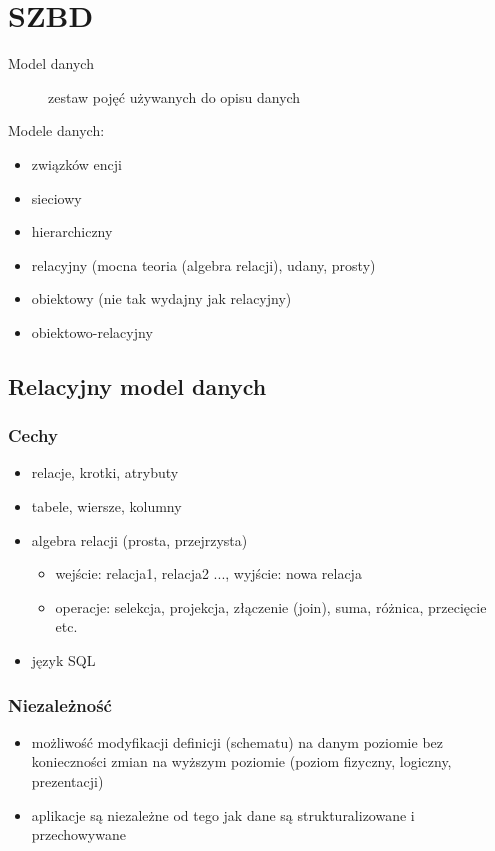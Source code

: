 \documentclass[12pt]{article}
\begin{document}
\section{\ac{SZBD}}

\begin{description}
\item[Model danych] zestaw pojęć używanych do opisu danych
\end{description}

Modele danych:
\begin{itemize}
\item związków encji
\item sieciowy
\item hierarchiczny
\item relacyjny (mocna teoria (algebra relacji), udany, prosty)
\item obiektowy (nie tak wydajny jak relacyjny)
\item obiektowo-relacyjny
\end{itemize}

\subsection{Relacyjny model danych}
\subsubsection{Cechy}

\begin{itemize}
\item relacje, krotki, atrybuty
\item tabele, wiersze, kolumny
\item algebra relacji (prosta, przejrzysta)
\begin{itemize}
\item wejście: relacja1, relacja2 ..., wyjście: nowa relacja
\item operacje: selekcja, projekcja, złączenie (join), suma, różnica, przecięcie etc.
\end{itemize}
\item język \acs{SQL}
\end{itemize}

\subsubsection{Niezależność}
\begin{itemize}
\item możliwość modyfikacji definicji (schematu) na danym poziomie bez konieczności zmian na wyższym poziomie
   (poziom fizyczny, logiczny, prezentacji)
\item aplikacje są niezależne od tego jak dane są strukturalizowane i przechowywane
\end{itemize}
\end{document}
